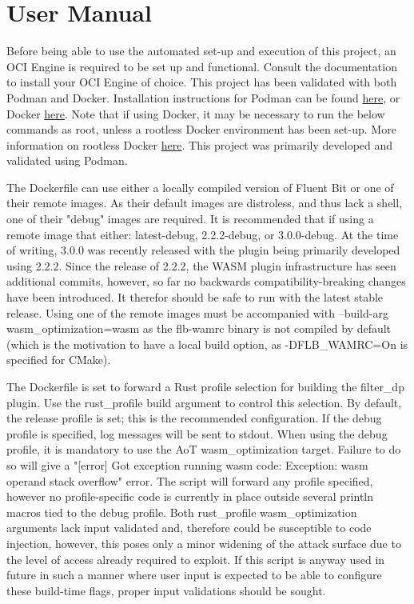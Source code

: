 \chapter{User Manual\label{chap:user_man}}

Before being able to use the automated set-up and execution of this project, an OCI Engine is required to be set up and functional. Consult the documentation to install your OCI Engine of choice. This project has been validated with both Podman and Docker. Installation instructions for Podman can be found \href{https://podman.io/docs/installation}{here},  or Docker \href{https://docs.docker.com/get-docker/}{here}. Note that if using Docker, it may be necessary to run the below commands as root, unless a rootless Docker environment has been set-up. More information on rootless Docker \href{https://docs.docker.com/engine/security/rootless/}{here}. This project was primarily developed and validated using Podman.

The Dockerfile can use either a locally compiled version of Fluent Bit or one of their remote images. As their default images are distroless, and thus lack a shell, one of their "debug" images are required. It is recommended that if using a remote image that either: latest-debug, 2.2.2-debug, or 3.0.0-debug. At the time of writing, 3.0.0 was recently released with the plugin being primarily developed using 2.2.2. Since the release of 2.2.2, the WASM plugin infrastructure has seen additional commits, however, so far no backwards compatibility-breaking changes have been introduced. It therefor should be safe to run with the latest stable release. Using one of the remote images must be accompanied with --build-arg wasm\_optimization=wasm as the flb-wamrc binary is not compiled by default (which is the motivation to have a local build option, as -DFLB\_WAMRC=On is specified for CMake). 

The Dockerfile is set to forward a Rust profile selection for building the filter\_dp plugin. Use the rust\_profile build argument to control this selection. By default, the release profile is set; this is the recommended configuration. If the debug profile is specified, log messages will be sent to stdout. When using the debug profile, it is mandatory to use the AoT wasm\_optimization target. Failure to do so will give a "[error] Got exception running wasm code: Exception: wasm operand stack overflow" error. The script will forward any profile specified, however no profile-specific code is currently in place outside several println macros tied to the debug profile. Both rust\_profile wasm\_optimization arguments lack input validated and, therefore could be susceptible to code injection, however, this poses only a minor widening of the attack surface due to the level of access already required to exploit. If this script is anyway used in future in such a manner where user input is expected to be able to configure these build-time flags, proper input validations should be sought. 